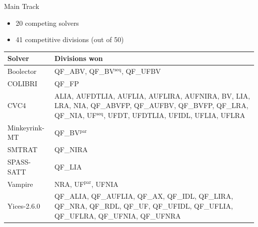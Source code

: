 \documentclass{beamer}
\begin{document}
\begin{frame}{Main Track}
  \begin{itemize}
  \item 20 competing solvers
  \item 41 competitive divisions (out of 50)
  \end{itemize}

  \vspace{-.5cm}
  
  \begin{center}
    \begin{tabular}{lp{}}
      Solver        & Divisions won \\ \hline
      Boolector     & {\small QF\_ABV, QF\_BV$^\text{seq}$, QF\_UFBV}\\
      COLIBRI       & {\small QF\_FP}\\
      CVC4          & {\small ALIA, AUFDTLIA, AUFLIA, AUFLIRA, AUFNIRA, BV, LIA, LRA, NIA, QF\_ABVFP, QF\_AUFBV, QF\_BVFP, QF\_LRA, QF\_NIA, UF$^\text{seq}$, UFDT, UFDTLIA, UFIDL, UFLIA, UFLRA}\\
      Minkeyrink-MT & {\small QF\_BV$^\text{par}$}\\
      SMTRAT        & {\small QF\_NIRA}\\
      SPASS-SATT    & {\small QF\_LIA}\\
      Vampire       & {\small NRA, UF$^\text{par}$, UFNIA}\\
      Yices-2.6.0   & {\small QF\_ALIA, QF\_AUFLIA, QF\_AX, QF\_IDL, QF\_LIRA, QF\_NRA, QF\_RDL, QF\_UF, QF\_UFIDL, QF\_UFLIA, QF\_UFLRA, QF\_UFNIA, QF\_UFNRA}
    \end{tabular}
  \end{center}

  \vspace{-7cm}

  \pause
  

\end{frame}
\end{document}
